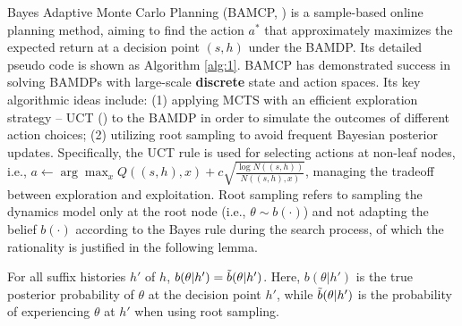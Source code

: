 Bayes Adaptive Monte Carlo Planning (BAMCP, \cite{DBLP:journals/jair/GuezSD13}) is a sample-based online planning method, aiming to find the action $a^*$ that approximately maximizes the expected return at a decision point $(s, h)$ under the BAMDP. Its detailed pseudo code is shown as Algorithm \ref{alg:1}. BAMCP has demonstrated success in solving BAMDPs with large-scale \textbf{discrete} state and action spaces. Its key algorithmic ideas include: (1) applying MCTS with an efficient exploration strategy -- UCT (\cite{DBLP:conf/ecml/KocsisS06}) to the BAMDP in order to simulate the outcomes of different action choices; (2) utilizing root sampling to avoid frequent Bayesian posterior updates. Specifically, the UCT rule is used for selecting actions at non-leaf nodes, i.e., {\small $a \leftarrow \arg \max_{x} Q((s, h), x) + c \sqrt{\frac{\log N((s, h))}{N((s, h), x)}}$}, managing the tradeoff between exploration and exploitation. Root sampling refers to sampling the dynamics model only at the root node (i.e., $\theta \sim b(\cdot)$) and not adapting the belief $b(\cdot)$ according to the Bayes rule during the search process, of which the rationality is justified in the following lemma.
\begin{lemma} \label{lem:1}
For all suffix histories $h'$ of $h$, $b(\theta|h') = \Tilde{b}(\theta|h')$. Here, $b(\theta|h')$ is the true posterior probability of $\theta$ at the decision point $h'$, while $\Tilde{b}(\theta|h')$ is the probability of experiencing $\theta$ at $h'$ when using root sampling.
\end{lemma}
